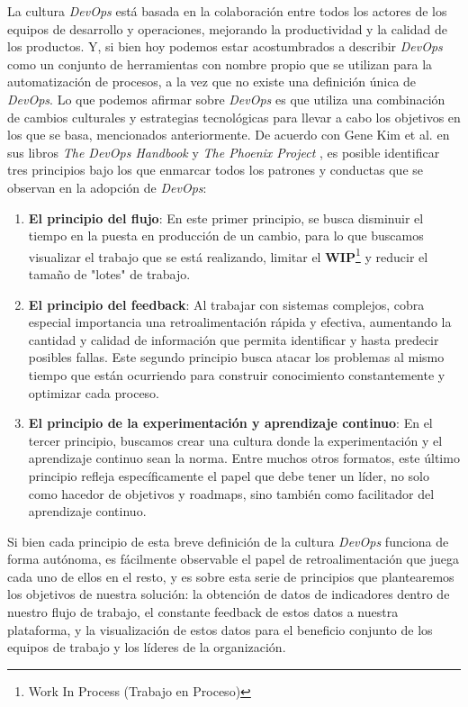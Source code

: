 \documentclass[journal]{IEEEtran}
\begin{document}
La cultura \textit{DevOps} está basada en la colaboración entre todos los actores de los equipos de desarrollo y operaciones, mejorando la productividad y la calidad de los productos. Y, si bien hoy podemos estar acostumbrados a describir \textit{DevOps} como un conjunto de herramientas con nombre propio que se utilizan para la automatización de procesos, a la vez que no existe una definición única de \textit{DevOps}.
Lo que podemos afirmar sobre \textit{DevOps} es que utiliza una combinación de cambios culturales y estrategias tecnológicas para llevar a cabo los objetivos en los que se basa, mencionados anteriormente.
De acuerdo con Gene Kim et al. en sus libros \textit{The DevOps Handbook} \cite{kim2021devops} y \textit{The Phoenix Project} \cite{kim2018phoenix}, es posible identificar tres principios bajo los que enmarcar todos los patrones y conductas que se observan en la adopción de \textit{DevOps}:
\begin{enumerate}
    \item \textbf{El principio del flujo}\cite[Part 1.2: The First Way: The Principles of Flow]{kim2021devops}: En este primer principio, se busca disminuir el tiempo en la puesta en producción de un cambio, para lo que buscamos visualizar el trabajo que se está realizando, limitar el \textbf{WIP}\footnote{Work In Process (Trabajo en Proceso)} y reducir el tamaño de "lotes" de trabajo.
    \item \textbf{El principio del feedback}\cite[Part 1.3: The Second Way: The Principles of Feedback]{kim2021devops}: Al trabajar con sistemas complejos, cobra especial importancia una retroalimentación rápida y efectiva, aumentando la cantidad y calidad de información que permita identificar y hasta predecir posibles fallas. Este segundo principio busca atacar los problemas al mismo tiempo que están ocurriendo para construir conocimiento constantemente y optimizar cada proceso.
    \item \textbf{El principio de la experimentación y aprendizaje continuo}\cite[Part 1.4: The Third Way: The Principles of Continual Learning and Experimentation]{kim2021devops}: En el tercer principio, buscamos crear una cultura donde la experimentación y el aprendizaje continuo sean la norma. Entre muchos otros formatos, este último principio refleja específicamente el papel que debe tener un líder, no solo como hacedor de objetivos y roadmaps, sino también como facilitador del aprendizaje continuo.
\end{enumerate}

Si bien cada principio de esta breve definición de la cultura \textit{DevOps} funciona de forma autónoma, es fácilmente observable el papel de retroalimentación que juega cada uno de ellos en el resto, y es sobre esta serie de principios que plantearemos los objetivos de nuestra solución: la obtención de datos de indicadores dentro de nuestro flujo de trabajo, el constante feedback de estos datos a nuestra plataforma, y la visualización de estos datos para el beneficio conjunto de los equipos de trabajo y los líderes de la organización.
\end{document}
